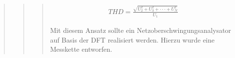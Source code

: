 \begin{quote}
\begin{quote}
\begin{quote}
		\begin{align}
		THD = \frac{\sqrt{U_2^2 + U_3^2 + \cdot \cdot \cdot + U_N^2}}{U_1}
		\end{align} 
		
		Mit diesem Ansatz sollte ein Netzoberschwingungsanalysator auf Basis der DFT
		realisiert werden. Hierzu wurde eine Messkette entworfen.
		
		
		\end{quote}%
	\end{quote}%
			
\end{quote}%
